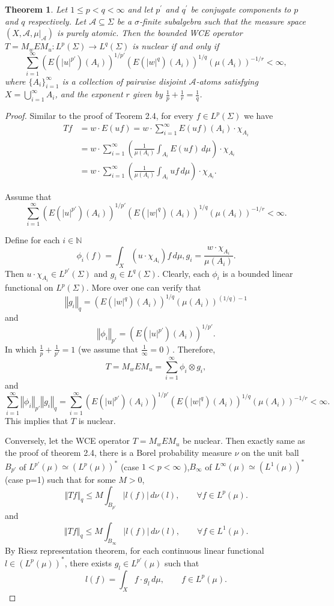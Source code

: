 \documentclass{amsart}
\newtheorem{thm}{Theorem}[section]
\theoremstyle{definition}\newtheorem{defn}[thm]{Definition}
\theoremstyle{remark}
\numberwithin{equation}{section}
\newcommand{\norm}[1]{\left\Vert#1\right\Vert}
\newcommand{\A}{\mathcal{A}}
\begin{document}
\begin{thm}\label{thm2.8}
	Let $1 \leq p<q < \infty$ and let \(p^{\prime}\) and \(q^{\prime}\) be conjugate components to \(p\) and \(q\) respectively. Let $\A \subseteq \Sigma$ be a $\sigma$-finite subalgebra such that the measure space $(X, \A, \mu|_{\A})$ is purely atomic. Then the bounded WCE operator $T = M_w E M_u : L^p(\Sigma) \to L^q(\Sigma)$ is nuclear if and only if
	\[
	\sum_{i=1}^{\infty} (E(|u|^{p'})(A_i))^{1/{p'}} (E(|w|^q)(A_i))^{1/q} (\mu(A_i))^{-1/r} < \infty,
	\]
	where $\{A_i\}_{i=1}^{\infty}$ is a collection of pairwise disjoint $\A$-atoms satisfying $X = \bigcup_{i=1}^{\infty} A_i$, and the exponent $r$ given by $\frac{1}{p} + \frac{1}{r} = \frac{1}{q}$.
\end{thm}

\begin{proof}
	Similar to the proof of Teorem 2.4, for every $f \in L^p(\Sigma)$ we have
	\begin{align*}
		T f &= w \cdot E(uf) = w \cdot \sum_{i=1}^{\infty} E(uf)(A_i) \cdot \chi_{A_i} \\
		&= w \cdot \sum_{i=1}^{\infty} \left( \frac{1}{\mu(A_i)} \int_{A_i} E(uf) \, d\mu \right) \cdot \chi_{A_i} \\
		&= w \cdot \sum_{i=1}^{\infty} \left( \frac{1}{\mu(A_i)} \int_{A_i} u f \, d\mu \right) \cdot \chi_{A_i}.
	\end{align*}
	
	Assume that
	\[
	 \sum_{i=1}^{\infty} (E(|u|^{p'})(A_i))^{1/{p'}} (E(|w|^q)(A_i))^{1/q} (\mu(A_i))^{-1/r} < \infty.
	\]
	
	Define for each $i \in \mathbb N$ 
\[
\phi_i(f) = \int_X (u \cdot \chi_{A_i}) f \, d\mu , g_i = \frac{w \cdot \chi_{A_i}}{\mu(A_i)}.
\]
 Then $u \cdot \chi_{A_i} \in L^{p'}(\Sigma)$ and $g_i \in L^q(\Sigma)$. Clearly, each $\phi_i$ is a bounded linear functional on $L^p(\Sigma)$. More over one can verify that \[
 \norm{g_i}_q = (E(|w|^q)(A_i))^{1/q}(\mu(A_i))^{({1/q})-1}
 \] and
 \[
 \norm{\phi_i}_{p'} = (E(|u|^{p'})(A_i))^{1/{p'}}.
 \] In which $\frac{1}{p} + \frac{1}{p'} = {1} $ (we assume that $\frac{1}{\infty} = {0} $ ) . Therefore,
	\[
	T = M_w E M_u = \sum_{i=1}^{\infty} \phi_i \otimes g_i,
	\]
	and
	\[
	\sum_{i=1}^{\infty} \norm{\phi_i}_{p'} \norm{g_i}_{q} = \sum_{i=1}^{\infty} (E(|u|^{p'})(A_i))^{1/{p'}} (E(|w|^q)(A_i))^{1/q} (\mu(A_i))^{-1/r} < \infty.
	\]
	This implies that $T$ is nuclear.
	
	Conversely, let the WCE operator $T = M_w E M_u$ be nuclear. Then exactly same as the proof of theorem 2.4, there is a Borel probability measure $\nu$ on the unit ball $B_{p'}$ of $L^{p'}(\mu) \simeq (L^p(\mu))^*$ (case \(1< p< \infty\) ),$B_{\infty}$ of $L^{\infty}(\mu) \simeq (L^{1}(\mu))^*$ (case p=1)  such that for some $M > 0$,
	\[
	\norm{T f}_q \leq M \int_{B_{p'}} |l(f)| \, d\nu(l), \qquad \forall f \in L^p(\mu).
	\]
	and
	\[
	\norm{T f}_q \leq M \int_{B_{\infty}} |l(f)| \, d\nu(l), \qquad \forall f \in L^{1}(\mu).
	\]
	By Riesz representation theorem,  for each continuous linear functional $l \in (L^p(\mu))^*$, there exists $g_l \in L^{p'}(\mu)$ such that
	\[
	l(f) = \int_X f \cdot g_l \, d\mu, \qquad f \in L^p(\mu).
	\]
	

\end{proof}
\end{document}
